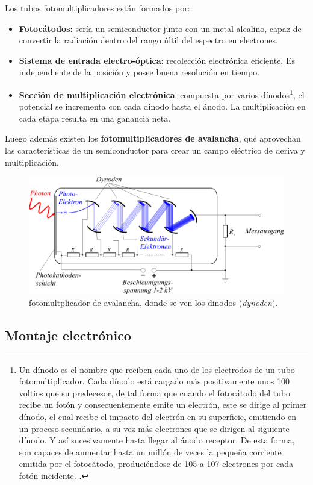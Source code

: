 Los tubos fotomultiplicadores están formados por: 

\begin{itemize}
    \item \textbf{Fotocátodos:} sería un semiconductor junto con un metal alcalino, capaz de convertir la radiación dentro del rango últil del espectro en electrones.
    \item \textbf{Sistema de entrada electro-óptica}: recolección electrónica eficiente. Es independiente de la posición y posee buena resolución en tiempo. 
    \item \textbf{Sección de multiplicación electrónica}: compuesta por varios  dínodos\footnote{Un dínodo es el nombre que reciben cada uno de los electrodos de un tubo fotomultiplicador. Cada dínodo está cargado más positivamente unos 100 voltios que su predecesor, de tal forma que cuando el fotocátodo del tubo recibe un fotón y consecuentemente emite un electrón, este se dirige al primer dínodo, el cual recibe el impacto del electrón en su superficie, emitiendo en un proceso secundario, a su vez más electrones que se dirigen al siguiente dínodo. Y así sucesivamente hasta llegar al ánodo receptor. De esta forma, son capaces de aumentar hasta un millón de veces la pequeña corriente emitida por el fotocátodo, produciéndose de 105 a 107 electrones por cada fotón incidente. \cite{wiki-dinodo}.}, el potencial se incrementa con cada dinodo hasta el ánodo. La multiplicación en cada etapa resulta en una ganancia neta.    
\end{itemize}
Luego además existen los \textbf{fotomultiplicadores de avalancha}, que aprovechan las características de un semiconductor para crear un campo eléctrico de deriva y multiplicación.

\begin{figure}[H] \centering
    \caption{fotomultplicador de avalancha, donde se ven los dinodos (\textit{dynoden}).}
    \includegraphics[width=0.7\linewidth]{Cuerpo/Ch_01/Detectores_Fotomultiplicador.png}
\end{figure}

\subsection{Montaje electrónico}

